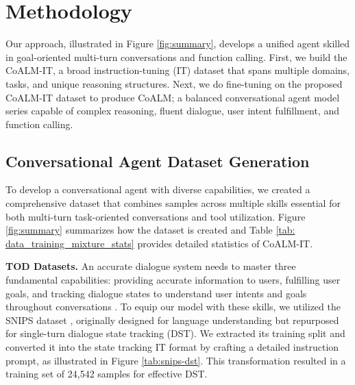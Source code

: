 \section{Methodology}
Our approach, illustrated in Figure \ref{fig:summary}, develops a unified agent skilled in goal-oriented multi-turn conversations and function calling. First, we build the CoALM-IT, a broad instruction-tuning (IT) dataset that spans multiple domains, tasks, and unique reasoning structures. Next, we do fine-tuning on the proposed CoALM-IT dataset to produce CoALM; a balanced conversational agent model series capable of complex reasoning, fluent dialogue, user intent fulfillment, and function calling. 


\subsection{Conversational Agent Dataset Generation}
\label{sec:dataset-generation}
To develop a conversational agent with diverse capabilities, we created a comprehensive dataset that combines samples across multiple skills essential for both multi-turn task-oriented conversations and tool utilization. Figure \ref{fig:summary} summarizes how the dataset is created and Table \ref{tab: data_training_mixture_stats} provides detailed statistics of CoALM-IT.

\vspace{3mm}

\noindent\textbf{TOD Datasets.} An accurate dialogue system needs to master three fundamental capabilities: providing accurate information to users, fulfilling user goals, and tracking dialogue states to understand user intents and goals throughout conversations \cite{paradise}. To equip our model with these skills, we utilized the SNIPS dataset \cite{coucke2018snips}, originally designed for language understanding but repurposed for single-turn dialogue state tracking (DST). We extracted its training split and converted it into the state tracking IT format by crafting a detailed instruction prompt, as illustrated in Figure \ref{tab:snips-dst}. This transformation resulted in a training set of 24,542 samples for effective DST.

\vspace{3mm}

